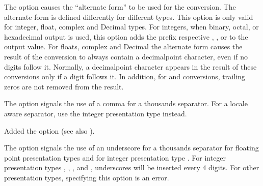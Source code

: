 \documentclass[letterpaper,10pt,english]{sphinxmanual}
\begin{document}
\ignorespaces
The \sphinxcode{\sphinxupquote{\textquotesingle{}\#\textquotesingle{}}} option causes the “alternate form” to be used for the
conversion.  The alternate form is defined differently for different
types.  This option is only valid for integer, float, complex and
Decimal types. For integers, when binary, octal, or hexadecimal output
is used, this option adds the prefix respective , , or
 to the output value. For floats, complex and Decimal the
alternate form causes the result of the conversion to always contain a
decimal\sphinxhyphen{}point character, even if no digits follow it. Normally, a
decimal\sphinxhyphen{}point character appears in the result of these conversions
only if a digit follows it. In addition, for  and 
conversions, trailing zeros are not removed from the result.

\ignorespaces
The \sphinxcode{\sphinxupquote{\textquotesingle{},\textquotesingle{}}} option signals the use of a comma for a thousands separator.
For a locale aware separator, use the  integer presentation type
instead.

Added the \sphinxcode{\sphinxupquote{\textquotesingle{},\textquotesingle{}}} option (see also ).

\ignorespaces
The \sphinxcode{\sphinxupquote{\textquotesingle{}\_\textquotesingle{}}} option signals the use of an underscore for a thousands
separator for floating point presentation types and for integer
presentation type .  For integer presentation types ,
, , and , underscores will be inserted every 4
digits.  For other presentation types, specifying this option is an
error.
\end{document}
